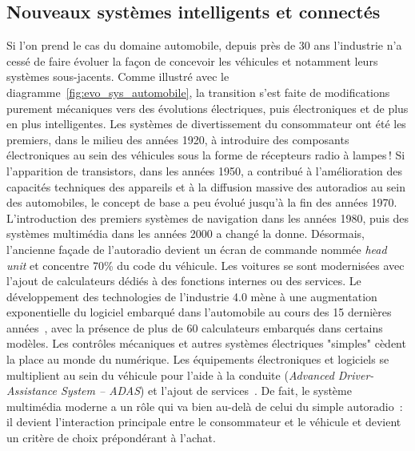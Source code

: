 \documentclass[french, a4paper, 11pt, twoside, pdftex]{StyleThese}
\begin{document}
	\subsection{Nouveaux systèmes intelligents et connectés}
		Si l'on prend le cas du domaine automobile, depuis près de 30 ans l'industrie n'a cessé de faire évoluer la façon de concevoir les véhicules et notamment leurs systèmes sous-jacents. Comme illustré avec le  diagramme~\ref{fig:evo_sys_automobile}, la transition s'est faite de modifications purement mécaniques vers des évolutions électriques, puis électroniques et de plus en plus intelligentes. Les systèmes de divertissement du consommateur ont été les premiers, dans le milieu des années 1920, à introduire des composants électroniques au sein des véhicules sous la forme de récepteurs radio à lampes ! Si l’apparition de transistors, dans les années 1950, a contribué à
		l’amélioration des capacités techniques des appareils et à la diffusion massive des autoradios au sein des automobiles, le concept de base a peu évolué jusqu'à la fin des années 1970. L’introduction des premiers systèmes de navigation dans les années 1980, puis des systèmes multimédia dans les années 2000 a changé la donne. Désormais, l'ancienne façade de l’autoradio devient un écran de commande nommée \emph{head unit} et concentre 70\% du code du véhicule.
		Les voitures se sont modernisées avec l'ajout de calculateurs dédiés à des fonctions internes ou des services. Le développement des technologies de l'industrie {4.0} mène à une augmentation exponentielle du logiciel embarqué dans l'automobile au cours des 15 dernières années~\cite{blanchet_industrie_2016}, avec la présence de plus de 60 calculateurs embarqués dans certains modèles. Les contrôles mécaniques et autres systèmes électriques "simples" cèdent la place au monde du numérique. Les équipements électroniques et logiciels se multiplient au sein du véhicule pour l’aide à la conduite (\textit{Advanced Driver-Assistance System -- ADAS}) et l’ajout de services~\cite{schmidt_automotive_2010}. De fait, le système multimédia moderne a un rôle qui va bien au-delà de celui du simple autoradio~: il devient l'interaction principale entre le consommateur et le véhicule et devient un critère de choix prépondérant à l'achat.
		
\end{document}
